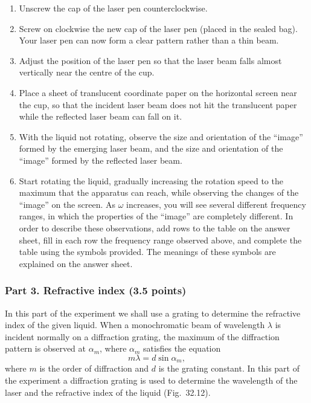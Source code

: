 \begin{enumerate}
\item[(1)] Unscrew the cap of the laser pen counterclockwise.
\item[(2)] Screw on clockwise the new cap of the laser pen (placed in the sealed bag). Your laser pen can now form a clear pattern rather than a thin beam.
\item[(3)] Adjust the position of the laser pen so that the laser beam falls almost vertically near the centre of the cup.
\item[(4)] Place a sheet of translucent coordinate paper on the horizontal screen near the cup, so that the incident laser beam does not hit the translucent paper while the reflected laser beam can fall on it.
\item[(5)] With the liquid not rotating, observe the size and orientation of the ``image'' formed by the emerging laser beam, and the size and orientation of the ``image'' formed by the reflected laser beam.
\item[(6)] Start rotating the liquid, gradually increasing the rotation speed to the maximum that the apparatus can reach, while observing the changes of the ``image'' on the screen. As $\omega$ increases, you will see several different frequency ranges, in which the properties of the ``image'' are completely different. In order to describe these observations, add rows to the table on the answer sheet, fill in each row the frequency range observed above, and complete the table using the symbols provided. The meanings of these symbols are explained on the answer sheet.
\end{enumerate}

\subsubsection*{Part 3. Refractive index (3.5 points)}

In this part of the experiment we shall use a grating to determine the refractive index of the given liquid. When a monochromatic beam of wavelength $\lambda$ is incident normally on a diffraction grating, the maximum of the diffraction pattern is observed at $\alpha_m$, where $\alpha_m$ satisfies the equation
\begin{equation}
m\lambda=d\sin\alpha_m, \tag{4}
\end{equation}
where $m$ is the order of diffraction and $d$ is the grating constant. In this part of the experiment a diffraction grating is used to determine the wavelength of the laser and the refractive index of the liquid (Fig.~32.12).

